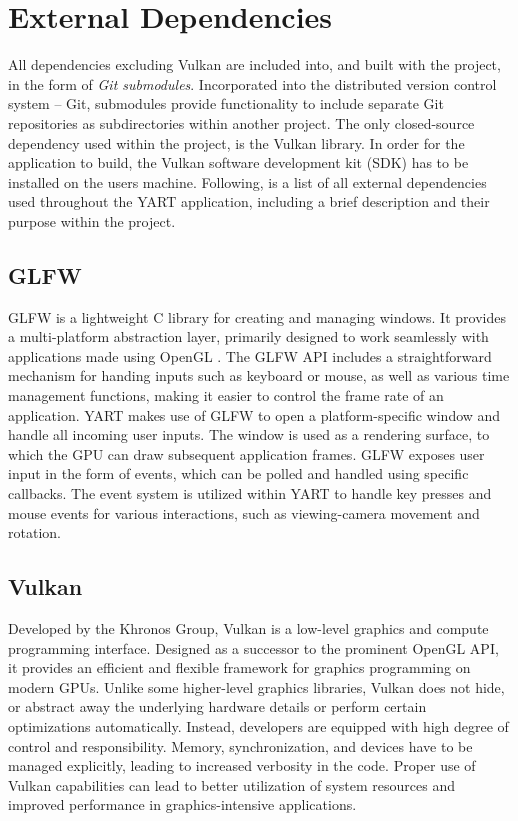 \section{External Dependencies}

All dependencies excluding Vulkan are included into, and built with the project, in the form of \textit{Git submodules}. 
Incorporated into the distributed version control system -- Git, submodules provide functionality to include separate Git repositories as subdirectories within another project.
The only closed-source dependency used within the project, is the Vulkan library.
In order for the application to build, the Vulkan software development kit (SDK) has to be installed on the users machine. 
Following, is a list of all external dependencies used throughout the YART application, including a brief description and their purpose within the project.

\subsection{GLFW}

GLFW \supercite{GLFW} is a lightweight C library for creating and managing windows.
It provides a multi-platform abstraction layer, primarily designed to work seamlessly with applications made using OpenGL \supercite{Neider1993}.
The GLFW API includes a straightforward mechanism for handing inputs such as keyboard or mouse, as well as various time management functions, making it easier to control the frame rate of an application.
YART makes use of GLFW to open a platform-specific window and handle all incoming user inputs. 
The window is used as a rendering surface, to which the GPU can draw subsequent application frames. 
GLFW exposes user input in the form of events, which can be polled and handled using specific callbacks. 
The event system is utilized within YART to handle key presses and mouse events for various interactions, such as viewing-camera movement and rotation.

\subsection{Vulkan}

Developed by the Khronos Group, Vulkan \supercite{Sellers2016} is a low-level graphics and compute programming interface.
Designed as a successor to the prominent OpenGL API, it provides an efficient and flexible framework for graphics programming on modern GPUs.
Unlike some higher-level graphics libraries, Vulkan does not hide, or abstract away the underlying hardware details or perform certain optimizations automatically. 
Instead, developers are equipped with high degree of control and responsibility.
Memory, synchronization, and devices have to be managed explicitly, leading to increased verbosity in the code.
Proper use of Vulkan capabilities can lead to better utilization of system resources and improved performance in graphics-intensive applications.

